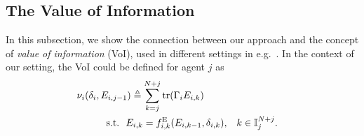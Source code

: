 \documentclass[letterpaper, 10 pt, conference]{ieeeconf}  %
\newcommand{\E}{\mathbb{E}}
\begin{document}
\subsection{The Value of Information}

In this subsection, we show the connection between our approach and the concept of \emph{value of information} (VoI), used in different settings in e.g.~\cite{Molin2015,Soleymani2016}. In the context of our setting, the VoI could be defined for agent $j$ as
\begin{subequations}
\label{eq:voi}
\begin{align}
&\nu_i(\delta_i,E_{i,j-1}) \triangleq  \sum_{k=j}^{N+j} \mathrm{tr}(\Gamma_{i} E_{i,k}) \hspace{-1em}\\
&\hspace{3em}\mathrm{s.t.} \ \ 
 E_{i,k} = f^\mathrm{E}_{i,k}(E_{i,k-1},\delta_{i,k}),&& k\in\mathbb{I}_{j}^{N+j}.
\end{align}
\end{subequations}
\end{document}
